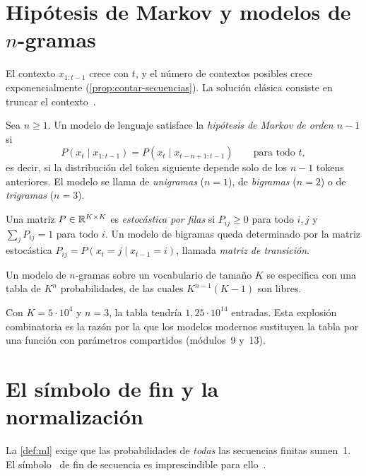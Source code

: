 \section{Hipótesis de Markov y modelos de \texorpdfstring{$n$}{n}-gramas}

El contexto $x_{1:t-1}$ crece con $t$, y el número de contextos posibles crece exponencialmente (\cref{prop:contar-secuencias}). La solución clásica consiste en truncar el contexto~\cite[§3.1.1]{jm3}.

\begin{definicion}\label{def:ngramas}
Sea $n\ge 1$. Un modelo de lenguaje satisface la \emph{hipótesis de Markov de orden $n-1$} si
\[
P(x_t\mid x_{1:t-1})=P(x_t\mid x_{t-n+1:t-1})\qquad\text{para todo } t,
\]
es decir, si la distribución del token siguiente depende solo de los $n-1$ tokens anteriores. El modelo se llama de \emph{unigramas} ($n=1$), de \emph{bigramas} ($n=2$) o de \emph{trigramas} ($n=3$).
\end{definicion}

\begin{definicion}
Una matriz $P\in\mathbb{R}^{K\times K}$ es \emph{estocástica por filas} si $P_{ij}\ge 0$ para todo $i,j$ y $\sum_{j}P_{ij}=1$ para todo $i$. Un modelo de bigramas queda determinado por la matriz estocástica $P_{ij}=P(x_t=j\mid x_{t-1}=i)$, llamada \emph{matriz de transición}.
\end{definicion}

\begin{proposicion}\label{prop:parametros}
Un modelo de $n$-gramas sobre un vocabulario de tamaño $K$ se especifica con una tabla de $K^{n}$ probabilidades, de las cuales $K^{n-1}(K-1)$ son libres.
\end{proposicion}

Con $K=5\cdot 10^{4}$ y $n=3$, la tabla tendría $1{,}25\cdot 10^{14}$ entradas. Esta explosión combinatoria es la razón por la que los modelos modernos sustituyen la tabla por una función con parámetros compartidos (módulos~9 y~13).

\addtocounter{definicion}{1}%

\addtocounter{figure}{1}%

\section{El símbolo de fin y la normalización}

La \cref{def:ml} exige que las probabilidades de \emph{todas} las secuencias finitas sumen~1. El símbolo \fin\ de fin de secuencia es imprescindible para ello~\cite[§3.1, ejercicio 3.5]{jm3}.

